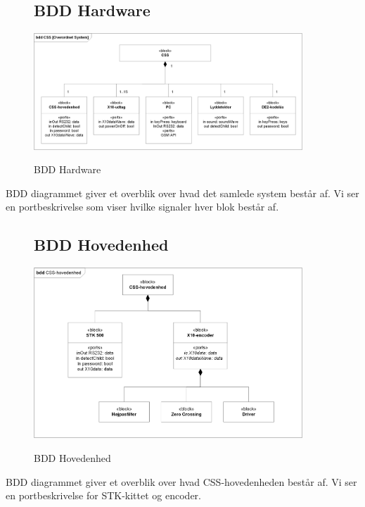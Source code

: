 \begin{figure}[H] \centering
\subsection{BDD Hardware}
{\includegraphics[width=0.9\textwidth]{billeder/diagrammer/BDD_Hardware}}
\caption{BDD Hardware}
\label{lab:bddhardware}
\raggedright
\end{figure}
BDD diagrammet giver et overblik over hvad det samlede system består af. Vi ser en portbeskrivelse som viser hvilke signaler hver blok består af.

\begin{figure}[H] \centering
\subsection{BDD Hovedenhed}
{\includegraphics[width=0.9\textwidth]{billeder/diagrammer/BDD_Hovedenhed}}
\caption{BDD Hovedenhed}
\label{lab:bddhovedenhed}
\raggedright
\end{figure}
BDD diagrammet giver et overblik over hvad CSS-hovedenheden består af. Vi ser en portbeskrivelse for STK-kittet og encoder. 

